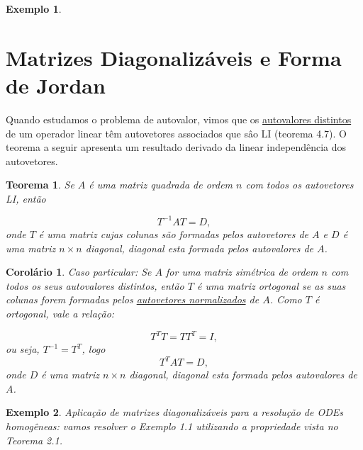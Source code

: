 \documentclass[a4paper,portuguese,9pt,final]{extarticle}
\newtheorem{theorem}{Teorema}[section]
\newtheorem{corollary}{Corolário}[section]
\newtheorem{example}{Exemplo}[section]
\begin{document}
\begin{multicols*}{2}
\begin{example}
            \end{example}
            
    \section{Matrizes Diagonalizáveis e Forma de Jordan}
    
        Quando estudamos o problema de autovalor, vimos que os \underline{autovalores distintos} de um operador linear têm autovetores associados que sâo LI (teorema 4.7). O teorema a seguir apresenta um resultado derivado da linear independência dos autovetores.
        
        \begin{theorem} 
            Se $A$ é uma matriz quadrada de ordem $n$ com todos os autovetores LI, então
            
            \begin{equation*}
                T^{-1}AT=D,
            \end{equation*}
            onde $T$ é uma matriz cujas colunas são formadas pelos autovetores de $A$ e $D$ é uma matriz $n \times n$ diagonal, diagonal esta formada pelos autovalores de $A$.
        \end{theorem}
        
        \begin{corollary}
            Caso particular: Se $A$ for uma matriz simétrica de ordem $n$ com todos os seus autovalores distintos, então $T$ é uma matriz ortogonal se as suas colunas forem formadas pelos \underline{autovetores normalizados} de $A$. Como $T$ é ortogonal, vale a relação:
            
            \begin{equation*}
                T^{T}T=TT^{T}=I,
            \end{equation*}
            ou seja, $T^{-1} = T^{T}$, logo 
            \begin{equation*}
                T^{T}AT=D,
            \end{equation*}
            onde  $D$ é uma matriz $n \times n$ diagonal, diagonal esta formada pelos autovalores de $A$.
        \end{corollary}
        
        \begin{example}
            Aplicação de matrizes diagonalizáveis para a resolução de ODEs homogêneas: vamos resolver o Exemplo 1.1 utilizando a propriedade vista no Teorema 2.1.
            

\end{example}
\end{multicols*}
\end{document}
